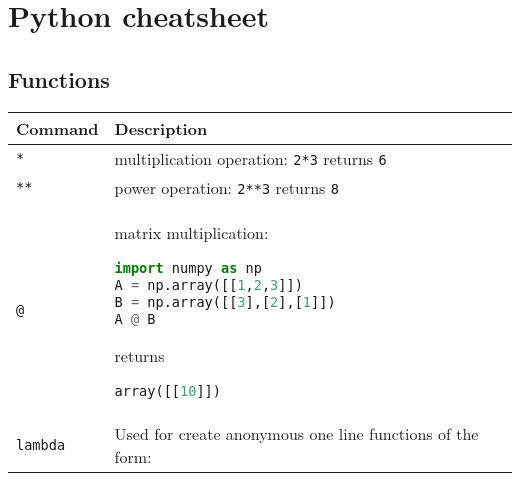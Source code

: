 \documentclass[]{article}
\date{}
\begin{document}
\section{Python cheatsheet}\label{python-cheatsheet}

\subsection{Functions}\label{functions}

\begin{longtable}[]{@{}ll@{}}
\toprule
\begin{minipage}[b]{0.17\columnwidth}\raggedright\strut
Command\strut
\end{minipage} & \begin{minipage}[b]{0.77\columnwidth}\raggedright\strut
Description\strut
\end{minipage}\tabularnewline
\midrule
\endhead
\begin{minipage}[t]{0.17\columnwidth}\raggedright\strut
\lstinline!*!\strut
\end{minipage} & \begin{minipage}[t]{0.77\columnwidth}\raggedright\strut
multiplication operation: \lstinline!2*3! returns \lstinline!6!\strut
\end{minipage}\tabularnewline
\begin{minipage}[t]{0.17\columnwidth}\raggedright\strut
\lstinline!**!\strut
\end{minipage} & \begin{minipage}[t]{0.77\columnwidth}\raggedright\strut
power operation: \lstinline!2**3! returns \lstinline!8!\strut
\end{minipage}\tabularnewline
\begin{minipage}[t]{0.17\columnwidth}\raggedright\strut
\lstinline!@!\strut
\end{minipage} & \begin{minipage}[t]{0.77\columnwidth}\raggedright\strut
matrix multiplication:

\begin{lstlisting}[language=Python]
import numpy as np
A = np.array([[1,2,3]])
B = np.array([[3],[2],[1]])
A @ B
\end{lstlisting}

returns

\begin{lstlisting}[language=Python]
array([[10]])
\end{lstlisting}
\strut
\end{minipage}\tabularnewline
\begin{minipage}[t]{0.17\columnwidth}\raggedright\strut
\lstinline!lambda!\strut
\end{minipage} & \begin{minipage}[t]{0.77\columnwidth}\raggedright\strut
Used for create anonymous one line functions of the form:


\end{minipage}
\end{longtable}
\end{document}
